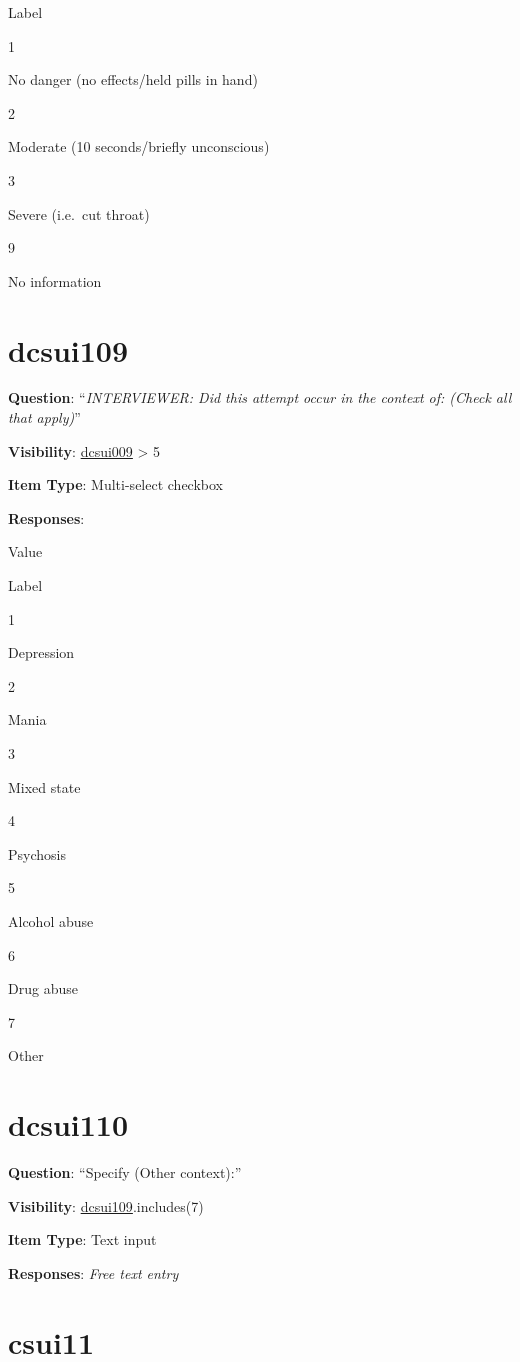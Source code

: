 \documentclass[]{book}
\begin{document}
Label

1

No danger (no effects/held pills in hand)

2

Moderate (10 seconds/briefly unconscious)

3

Severe (i.e.~cut throat)

9

No information

\hypertarget{dcsui109}{%
\section{dcsui109}\label{dcsui109}}

\textbf{Question}: ``\emph{INTERVIEWER: Did this attempt occur in the context of: (Check all that apply)}''

\textbf{Visibility}: \protect\hyperlink{dcsui009}{dcsui009} \textgreater{} 5

\textbf{Item Type}: Multi-select checkbox

\textbf{Responses}:

Value

Label

1

Depression

2

Mania

3

Mixed state

4

Psychosis

5

Alcohol abuse

6

Drug abuse

7

Other

\hypertarget{dcsui110}{%
\section{dcsui110}\label{dcsui110}}

\textbf{Question}: ``Specify (Other context):''

\textbf{Visibility}: \protect\hyperlink{dcsui109}{dcsui109}.includes(7)

\textbf{Item Type}: Text input

\textbf{Responses}: \emph{Free text entry}

\hypertarget{csui11}{%
\section{csui11}\label{csui11}}
\end{document}
